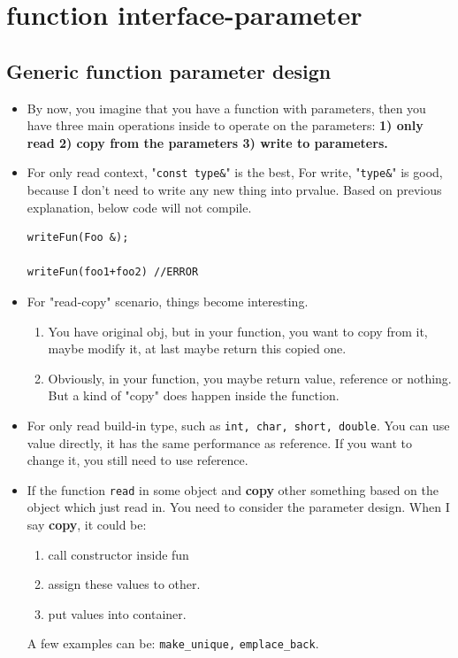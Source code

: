 \documentclass[a4paper,11pt,twoside]{book}
\begin{document}
\section{function interface-parameter}

\subsection{Generic function parameter design}

\begin{itemize}

\item  By now, you imagine that you have a function with parameters, then you have three main operations inside to operate on the parameters: \textbf{1) only read 2) copy from the parameters 3) write to parameters.}

\item For only read context, "\texttt{const type\&}" is the best, For write, "\texttt{type\&}" is good, because I don't need to write any new thing into prvalue. Based on previous explanation, below code will not compile. 
\begin{lstlisting}[numbers=none]
writeFun(Foo &);

writeFun(foo1+foo2) //ERROR
\end{lstlisting}

\item For "read-copy" scenario, things become interesting.
\begin{enumerate}
	\item You have original obj, but in your function, you want to copy from it, maybe modify it, at last maybe return this copied one.

	\item Obviously, in your function, you maybe return value, reference or nothing. But a kind of "copy" does happen inside the function.
\end{enumerate}

\item For only read build-in type, such as \texttt{int, char, short, double}. You can use value directly, it has the same performance as reference. If you want to change it, you still need to use reference.

\item If the function \texttt{read} in some object and \textbf{copy} other something based on the object which just read in. You need to consider the parameter design. When I say \textbf{copy}, it could be:
\begin{enumerate}
	\item call constructor inside fun
	\item assign these values to other.
	\item put values into container.
\end{enumerate} 
A few examples can be: \texttt{make\_unique,} \texttt{emplace\_back}.
\end{itemize}
\end{document}
